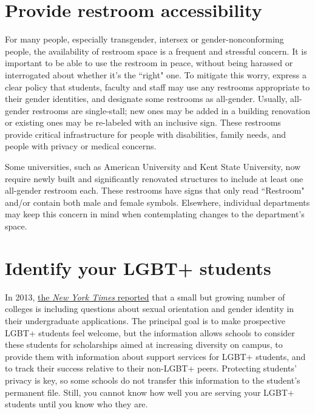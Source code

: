 \section {Provide restroom accessibility}
\label{restrooms}
For many people, especially transgender, intersex or gender-nonconforming people, the availability of restroom space is a frequent and stressful concern. It is important to be able to use the restroom in peace, without being harassed or interrogated about whether it's the ``right" one. To mitigate this worry, express a clear policy that students, faculty and staff may use any restrooms appropriate to their gender identities, and designate some restrooms as all-gender. Usually, all-gender restrooms are single-stall; new ones may be added in a building renovation or existing ones may be re-labeled with an inclusive sign. These restrooms provide critical infrastructure for people with disabilities, family needs, and people with privacy or medical concerns.

Some universities, such as American University and Kent State University, now require newly built and significantly renovated structures to include at least one all-gender restroom each. These restrooms have signs that only read ``Restroom" and/or contain both male and female symbols. Elsewhere, individual departments may keep this concern in mind when contemplating changes to the department's space.


\section {Identify your LGBT+ students}
\label{univ-identify}
In 2013, \href{http://www.nytimes.com/2013/08/04/education/edlife/more-college-applications-ask-about-sexual-identity.html?_r=0} {the {\em New York Times} reported} that a small but growing number of colleges is including questions about sexual orientation and gender identity in their undergraduate applications.  The principal goal is to make prospective LGBT+ students feel welcome, but the information allows schools to consider these students for scholarships aimed at increasing diversity on campus, to provide them with information about support services for LGBT+ students, and to track their success relative to their non-LGBT+ peers.  Protecting students' privacy is key, so some schools do not transfer this information to the student's permanent file.  Still, you cannot know how well you are serving your LGBT+ students until you know who they are.


